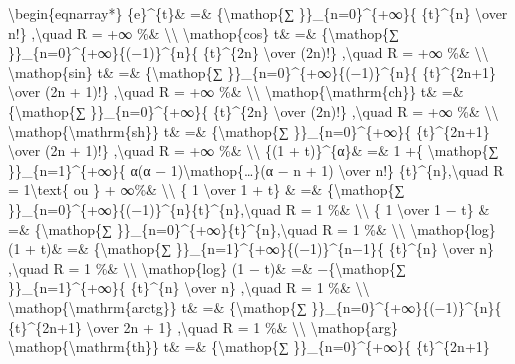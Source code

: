 \documentclass[]{article}
\begin{document}
\textbackslash{}begin\{eqnarray*\} \{e\}\^{}\{t\}\& =\&
\{\textbackslash{}mathop\{∑ \}\}\_\{n=0\}\^{}\{+∞\}\{ \{t\}\^{}\{n\}
\textbackslash{}over n!\} ,\textbackslash{}quad R = +∞ \%\&
\textbackslash{}\textbackslash{} \textbackslash{}mathop\{cos\} t\& =\&
\{\textbackslash{}mathop\{∑ \}\}\_\{n=0\}\^{}\{+∞\}\{(−1)\}\^{}\{n\}\{
\{t\}\^{}\{2n\} \textbackslash{}over (2n)!\} ,\textbackslash{}quad R =
+∞ \%\& \textbackslash{}\textbackslash{} \textbackslash{}mathop\{sin\}
t\& =\& \{\textbackslash{}mathop\{∑
\}\}\_\{n=0\}\^{}\{+∞\}\{(−1)\}\^{}\{n\}\{ \{t\}\^{}\{2n+1\}
\textbackslash{}over (2n + 1)!\} ,\textbackslash{}quad R = +∞ \%\&
\textbackslash{}\textbackslash{}
\textbackslash{}mathop\{\textbackslash{}mathrm\{ch\}\} t\& =\&
\{\textbackslash{}mathop\{∑ \}\}\_\{n=0\}\^{}\{+∞\}\{ \{t\}\^{}\{2n\}
\textbackslash{}over (2n)!\} ,\textbackslash{}quad R = +∞ \%\&
\textbackslash{}\textbackslash{}
\textbackslash{}mathop\{\textbackslash{}mathrm\{sh\}\} t\& =\&
\{\textbackslash{}mathop\{∑ \}\}\_\{n=0\}\^{}\{+∞\}\{ \{t\}\^{}\{2n+1\}
\textbackslash{}over (2n + 1)!\} ,\textbackslash{}quad R = +∞ \%\&
\textbackslash{}\textbackslash{} \{(1 + t)\}\^{}\{α\}\& =\& 1 +\{
\textbackslash{}mathop\{∑ \}\}\_\{n=1\}\^{}\{+∞\}\{ α(α −
1)\textbackslash{}mathop\{\ldots{}\}(α − n + 1) \textbackslash{}over
n!\} \{t\}\^{}\{n\},\textbackslash{}quad R = 1\textbackslash{}text\{ ou
\} + ∞\%\& \textbackslash{}\textbackslash{} \{ 1 \textbackslash{}over 1
+ t\} \& =\& \{\textbackslash{}mathop\{∑
\}\}\_\{n=0\}\^{}\{+∞\}\{(−1)\}\^{}\{n\}\{t\}\^{}\{n\},\textbackslash{}quad
R = 1 \%\& \textbackslash{}\textbackslash{} \{ 1 \textbackslash{}over 1
− t\} \& =\& \{\textbackslash{}mathop\{∑
\}\}\_\{n=0\}\^{}\{+∞\}\{t\}\^{}\{n\},\textbackslash{}quad R = 1 \%\&
\textbackslash{}\textbackslash{} \textbackslash{}mathop\{log\} (1 + t)\&
=\& \{\textbackslash{}mathop\{∑
\}\}\_\{n=1\}\^{}\{+∞\}\{(−1)\}\^{}\{n−1\}\{ \{t\}\^{}\{n\}
\textbackslash{}over n\} ,\textbackslash{}quad R = 1 \%\&
\textbackslash{}\textbackslash{} \textbackslash{}mathop\{log\} (1 − t)\&
=\& −\{\textbackslash{}mathop\{∑ \}\}\_\{n=1\}\^{}\{+∞\}\{
\{t\}\^{}\{n\} \textbackslash{}over n\} ,\textbackslash{}quad R = 1 \%\&
\textbackslash{}\textbackslash{}
\textbackslash{}mathop\{\textbackslash{}mathrm\{arctg\}\} t\& =\&
\{\textbackslash{}mathop\{∑ \}\}\_\{n=0\}\^{}\{+∞\}\{(−1)\}\^{}\{n\}\{
\{t\}\^{}\{2n+1\} \textbackslash{}over 2n + 1\} ,\textbackslash{}quad R
= 1 \%\& \textbackslash{}\textbackslash{} \textbackslash{}mathop\{arg\}
\textbackslash{}mathop\{\textbackslash{}mathrm\{th\}\} t\& =\&
\{\textbackslash{}mathop\{∑ \}\}\_\{n=0\}\^{}\{+∞\}\{ \{t\}\^{}\{2n+1\}
\end{document}
